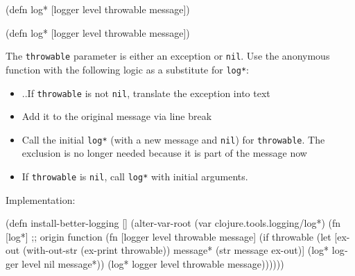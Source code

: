 \ifx\DEVICETYPE\MOBILE

\begin{english}
  \begin{clojure}
(defn log*
  [logger level throwable message])
  \end{clojure}
\end{english}

\else

\begin{english}
  \begin{clojure}
(defn log* [logger level throwable message])
  \end{clojure}
\end{english}

\fi

The \verb|throwable| parameter is either an exception or \verb|nil|.
Use the anonymous function with the following logic as a substitute for \verb|log*|:

\begin{itemize}

\item

..If \verb|throwable| is not \verb|nil|, translate the exception into text

\item
  Add it to the original message via line break

\item
  Call the initial \verb|log*| (with a new message and \verb|nil|) for \verb|throwable|.
The exclusion is no longer needed because it is part of the message now

\item
  If \verb|throwable| is \verb|nil|, call \verb|log*| with initial arguments.

\end{itemize}

\noindent
Implementation:


\ifx\DEVICETYPE\MOBILE

\begin{english}
  \begin{clojure/lines}
(defn install-better-logging []
  (alter-var-root
   (var clojure.tools.logging/log*)
   (fn [log*] ;; origin function
     (fn [logger level
          throwable message]
       (if throwable
         (let [ex-out (with-out-str
                        (ex-print
                          throwable))
               message* (str message
                          \newline
                          ex-out)]
           (log* logger
             level nil message*))
           (log* logger level
             throwable message))))))
  \end{clojure/lines}
\end{english}

